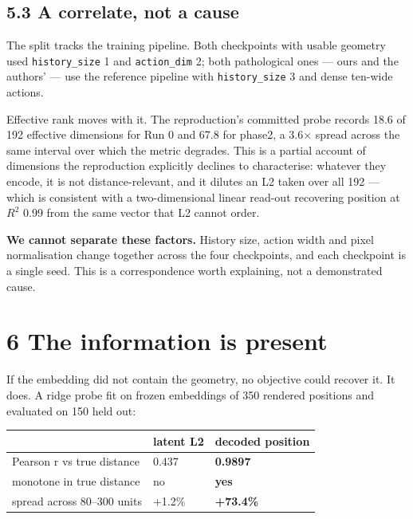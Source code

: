 \documentclass[10pt]{article}
\newcounter{none}
\begin{document}
\subsection{5.3 A correlate, not a cause}\label{a-correlate-not-a-cause}

The split tracks the training pipeline. Both checkpoints with usable geometry
used \texttt{history\_size} 1 and \texttt{action\_dim} 2; both pathological ones --- ours and
the authors' --- use the reference pipeline with \texttt{history\_size} 3 and dense
ten-wide actions.

Effective rank moves with it. The reproduction's committed probe records 18.6
of 192 effective dimensions for Run 0 and 67.8 for phase2, a 3.6$\times$ spread
across the same interval over which the metric degrades. This is a partial
account of dimensions the reproduction explicitly declines to characterise:
whatever they encode, it is not distance-relevant, and it dilutes an L2 taken
over all 192 --- which is consistent with a two-dimensional linear read-out
recovering position at $R^{2}$ 0.99 from the same vector that L2 cannot order.

\textbf{We cannot separate these factors.} History size, action width and pixel
normalisation change together across the four checkpoints, and each
checkpoint is a single seed. This is a correspondence worth explaining, not a
demonstrated cause.

\section{6 The information is present}\label{the-information-is-present}

If the embedding did not contain the geometry, no objective could recover it.
It does. A ridge probe fit on frozen embeddings of 350 rendered positions and
evaluated on 150 held out:

{\def\LTcaptype{none} %
\begin{longtable}[]{@{}lll@{}}
\toprule\noalign{}
& latent L2 & decoded position \\
\midrule\noalign{}
\endhead
\bottomrule\noalign{}
\endlastfoot
Pearson r vs true distance & 0.437 & \textbf{0.9897} \\
monotone in true distance & no & \textbf{yes} \\
spread across 80--300 units & +1.2\% & \textbf{+73.4\%} \\
\end{longtable}
}
\end{document}
